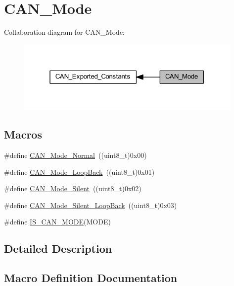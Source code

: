 \hypertarget{group___c_a_n___mode}{}\section{C\+A\+N\+\_\+\+Mode}
\label{group___c_a_n___mode}
Collaboration diagram for C\+A\+N\+\_\+\+Mode\+:
\nopagebreak
\begin{figure}[H]
\begin{center}
\leavevmode
\includegraphics[width=313pt]{group___c_a_n___mode}
\end{center}
\end{figure}
\subsection*{Macros}
\begin{DoxyCompactItemize}
\item 
\#define \hyperlink{group___c_a_n___mode_gaaf1f48ab4917ccfd5fd31dd781d59e29}{C\+A\+N\+\_\+\+Mode\+\_\+\+Normal}~((uint8\+\_\+t)0x00)
\item 
\#define \hyperlink{group___c_a_n___mode_gaad036c944403186eb3496ff65020c0ee}{C\+A\+N\+\_\+\+Mode\+\_\+\+Loop\+Back}~((uint8\+\_\+t)0x01)
\item 
\#define \hyperlink{group___c_a_n___mode_gac05e5d666f18eb35e8da70e6e17e8fb8}{C\+A\+N\+\_\+\+Mode\+\_\+\+Silent}~((uint8\+\_\+t)0x02)
\item 
\#define \hyperlink{group___c_a_n___mode_ga087afa0d24d2cf399225993573c984eb}{C\+A\+N\+\_\+\+Mode\+\_\+\+Silent\+\_\+\+Loop\+Back}~((uint8\+\_\+t)0x03)
\item 
\#define \hyperlink{group___c_a_n___mode_ga5d6480c240edeba383b4e07d65814d98}{I\+S\+\_\+\+C\+A\+N\+\_\+\+M\+O\+DE}(M\+O\+DE)
\end{DoxyCompactItemize}


\subsection{Detailed Description}


\subsection{Macro Definition Documentation}
\mbox{\label{group___c_a_n___mode_gaad036c944403186eb3496ff65020c0ee}} 
